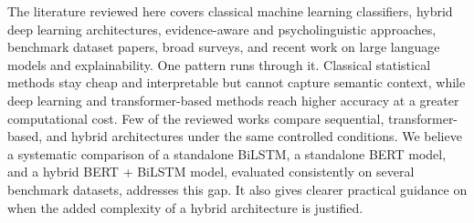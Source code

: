 The literature reviewed here covers classical machine learning classifiers, hybrid deep learning architectures, evidence-aware and psycholinguistic approaches, benchmark dataset papers, broad surveys, and recent work on large language models and explainability. One pattern runs through it. Classical statistical methods stay cheap and interpretable but cannot capture semantic context, while deep learning and transformer-based methods reach higher accuracy at a greater computational cost. Few of the reviewed works compare sequential, transformer-based, and hybrid architectures under the same controlled conditions. We believe a systematic comparison of a standalone BiLSTM, a standalone BERT model, and a hybrid BERT + BiLSTM model, evaluated consistently on several benchmark datasets, addresses this gap. It also gives clearer practical guidance on when the added complexity of a hybrid architecture is justified.
